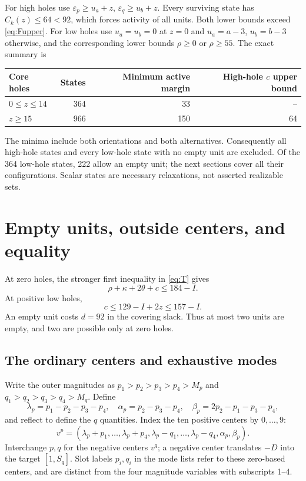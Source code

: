 \documentclass[11pt,a4paper]{article}
\begin{document}
For high holes use $\varepsilon_p\ge u_a+z$, $\varepsilon_q\ge u_b+z$.
Every surviving state has $C_k(z)\le64<92$, which forces activity of all
units. Both lower bounds exceed \eqref{eq:Fupper}.
For low holes use $u_a=u_b=0$ at $z=0$ and
$u_a=a-3$, $u_b=b-3$ otherwise, and the corresponding lower bounds
$\rho\ge0$ or $\rho\ge55$. The exact summary is
\begin{center}
\begin{tabular}{lrrr}
\toprule
Core holes&States&Minimum active margin&High-hole $c$ upper bound\\
\midrule
$0\le z\le14$&364&33&--\\
$z\ge15$&966&150&64\\
\bottomrule
\end{tabular}
\end{center}
The minima include both orientations and both alternatives. Consequently
all high-hole states and every low-hole state with no empty unit are
excluded. Of the 364 low-hole states, 222 allow an empty unit; the next
sections cover all their configurations. Scalar states are necessary
relaxations, not asserted realizable sets.

\section{Empty units, outside centers, and equality}
At zero holes, the stronger first inequality in \eqref{eq:T} gives
\begin{equation}\label{eq:zero}
 \rho+\kappa+2\theta+c\le184-I.
\end{equation}
At positive low holes,
\begin{equation}\label{eq:positive}
 c\le129-I+2z\le157-I.
\end{equation}
An empty unit costs $d=92$ in the covering slack. Thus at most two units
are empty, and two are possible only at zero holes.

\subsection{The ordinary centers and exhaustive modes}
Write the outer magnitudes as $p_1>p_2>p_3>p_4>M_p$ and
$q_1>q_2>q_3>q_4>M_q$. Define
\[
 \lambda_p=p_1-p_2-p_3-p_4,\quad
 \alpha_p=p_2-p_3-p_4,\quad
 \beta_p=2p_2-p_1-p_3-p_4,
\]
and reflect to define the $q$ quantities. Index the ten positive centers
by $0,\ldots,9$:
\[
 v^p=(\lambda_p+p_1,\ldots,\lambda_p+p_4,
       \lambda_p-q_1,\ldots,\lambda_p-q_4,\alpha_p,\beta_p).
\]
Interchange $p,q$ for the negative centers $v^q$; a negative center
translates $-D$ into the target $[1,S_q]$.
Slot labels $p_i,q_i$ in the mode lists refer to these zero-based centers,
and are distinct from the four magnitude variables with subscripts 1--4.
\end{document}
